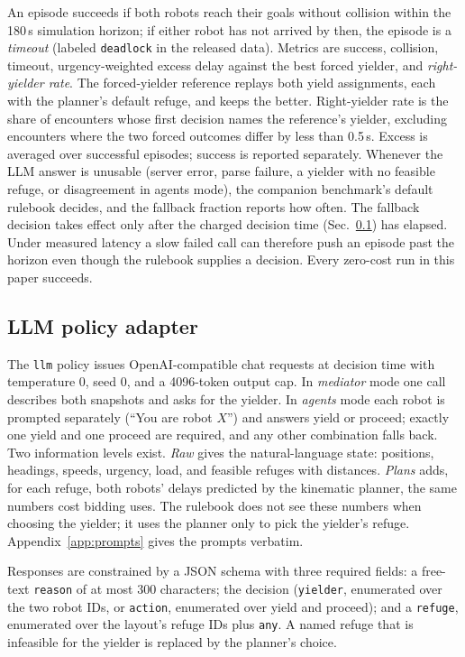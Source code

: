 \documentclass[journal]{IEEEtran}
\begin{document}
An episode succeeds if both robots reach their goals without collision within the 180\,s simulation horizon; if either robot has not arrived by then, the episode is a \emph{timeout} (labeled \texttt{deadlock} in the released data). Metrics are success, collision, timeout, urgency-weighted excess delay against the best forced yielder, and \emph{right-yielder rate}. The forced-yielder reference replays both yield assignments, each with the planner's default refuge, and keeps the better. Right-yielder rate is the share of encounters whose first decision names the reference's yielder, excluding encounters where the two forced outcomes differ by less than 0.5\,s. Excess is averaged over successful episodes; success is reported separately. Whenever the LLM answer is unusable (server error, parse failure, a yielder with no feasible refuge, or disagreement in agents mode), the companion benchmark's default rulebook decides, and the fallback fraction reports how often. The fallback decision takes effect only after the charged decision time (Sec.~\ref{sec:adapter}) has elapsed. Under measured latency a slow failed call can therefore push an episode past the horizon even though the rulebook supplies a decision. Every zero-cost run in this paper succeeds.

\subsection{LLM policy adapter}
\label{sec:adapter}
The \texttt{llm} policy issues OpenAI-compatible chat requests at decision time with temperature 0, seed 0, and a 4096-token output cap. In \emph{mediator} mode one call describes both snapshots and asks for the yielder. In \emph{agents} mode each robot is prompted separately (``You are robot $X$'') and answers yield or proceed; exactly one yield and one proceed are required, and any other combination falls back. Two information levels exist. \emph{Raw} gives the natural-language state: positions, headings, speeds, urgency, load, and feasible refuges with distances. \emph{Plans} adds, for each refuge, both robots' delays predicted by the kinematic planner, the same numbers cost bidding uses. The rulebook does not see these numbers when choosing the yielder; it uses the planner only to pick the yielder's refuge. Appendix~\ref{app:prompts} gives the prompts verbatim.

Responses are constrained by a JSON schema with three required fields: a free-text \texttt{reason} of at most 300 characters; the decision (\texttt{yielder}, enumerated over the two robot IDs, or \texttt{action}, enumerated over yield and proceed); and a \texttt{refuge}, enumerated over the layout's refuge IDs plus \texttt{any}. A named refuge that is infeasible for the yielder is replaced by the planner's choice.
\end{document}
